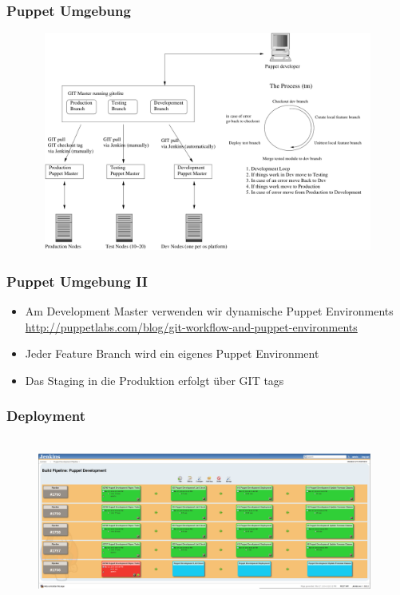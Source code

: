 \documentclass{beamer}
\begin{document}

\begin{frame}
\end{frame}

\begin{frame}
  \frametitle{Puppet Umgebung}
  \begin{figure}[ht]
    \centering
      \includegraphics[height=7.2cm,width=11.5cm]{../pics/puppet_deployment}
  \end{figure}
\end{frame}

\begin{frame}
  \frametitle{Puppet Umgebung II}

  \begin{itemize}
  \item Am Development Master verwenden wir dynamische Puppet Environments \\
    \tiny{\url{http://puppetlabs.com/blog/git-workflow-and-puppet-environments}}
    \normalsize
  \item Jeder Feature Branch wird ein eigenes Puppet Environment
  \item Das Staging in die Produktion erfolgt über GIT tags
  \end{itemize}
\end{frame}

\begin{frame}
  \frametitle{Deployment}
  \begin{figure}[ht]
    \centering
      \includegraphics[height=5.5cm,width=11cm]{../pics/jenkins_pipeline.png}
    \label{fig:stack}
  \end{figure}
\end{frame}
\end{document}
